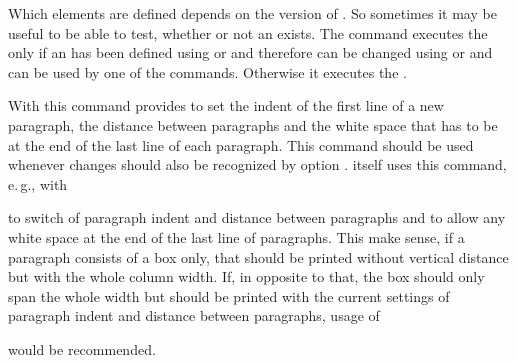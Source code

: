 \begin{Declaration}
\end{Declaration}
%
Which elements are defined depends on the
version of \KOMAScript. So sometimes it may be useful to be able to test,
whether or not an  exists. The command executes the  only if an  has been defined using 
or  and therefore can be changed using
 or  and can be used by one of the
 commands. Otherwise it executes the .%
%


\begin{Declaration}
\end{Declaration}
%
With this command \KOMAScript{} provides to set the indent of the first line
of a new paragraph, the distance between paragraphs and the white space that
has to be at the end of the last line of each paragraph. This command should
be used whenever changes should also be recognized by option
. \KOMAScript{} itself uses
this command, e.\,g., with
\begin{lstcode}[belowskip=\dp\strutbox plus 1ex]
\end{lstcode}
to switch of paragraph indent and distance between paragraphs and to allow any
white space at the end of the last line of paragraphs. This make sense, if a
paragraph consists of a box only, that should be printed without vertical
distance but with the whole column width. If, in opposite to that, the box
should only span the whole width but should be printed with the current
settings of paragraph indent and distance between paragraphs, usage of
\begin{lstcode}[belowskip=\dp\strutbox plus 1ex]
  \setlength{\parfillskip}{0pt plus 1fil}
\end{lstcode}
would be recommended.

